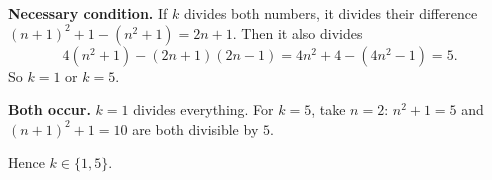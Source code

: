 \textbf{Necessary condition.} If $k$ divides both numbers, it divides their difference $(n+1)^2+1-(n^2+1)=2n+1$. Then it also divides
\[
4\left(n^2+1\right)-(2n+1)(2n-1)=4n^2+4-\left(4n^2-1\right)=5 .
\]
So $k=1$ or $k=5$.

\textbf{Both occur.} $k=1$ divides everything. For $k=5$, take $n=2$: $n^2+1=5$ and $(n+1)^2+1=10$ are both divisible by $5$.

Hence $k\in\boxed{\{1,5\}}$.
